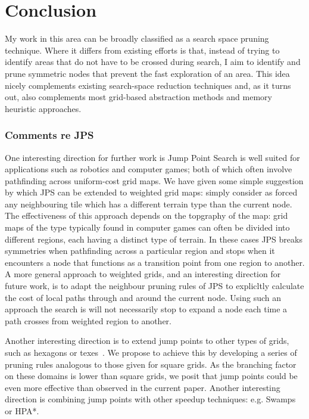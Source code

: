 \chapter{Conclusion}
\label{cha::conclusion}
My work in this area can be broadly classified as a search space pruning
technique. Where it differs from existing efforts is that, instead of trying to
identify areas that do not have to be crossed during search, I aim to identify
and prune symmetric nodes that prevent the fast exploration of an area. This
idea nicely complements existing search-space reduction techniques and, as it
turns out, also complements most grid-based abstraction methods and memory
heuristic approaches.

\subsection{Comments re JPS}
One interesting direction for further work is Jump Point Search is well suited
for applications such as robotics and computer games; both of which often
involve pathfinding across uniform-cost grid maps.  We have given some simple
suggestion by which JPS can be extended to weighted grid maps: simply consider
as forced any neighbouring tile which has a different terrain type than the
current node. The effectiveness of this approach depends on the topgraphy of
the map: grid maps of the type typically found in computer games can often be
divided into different regions, each having a distinct type of terrain. In
these cases JPS breaks symmetries when pathfinding across a particular region
and stops when it encounters a node that functions as a transition point from
one region to another. A more general approach to weighted grids, and an
interesting direction for future work, is to adapt the neighbour pruning rules
of JPS to explicltly calculate the cost of local paths through and around the
current node.  Using such an approach the search is will not necessarily stop
to expand a node each time a path crosses from weighted region to another.

Another interesting direction is to extend jump points to other types of
grids, such as hexagons or texes~\cite{yap02}. We propose to achieve this by
developing  a series of pruning rules analogous to those given for square
grids.  As the branching factor on these domains is lower than square grids,
we posit that jump points could be even more effective than observed in the
current paper.  Another interesting direction is combining jump points with
other speedup techniques: e.g. Swamps or HPA*.
